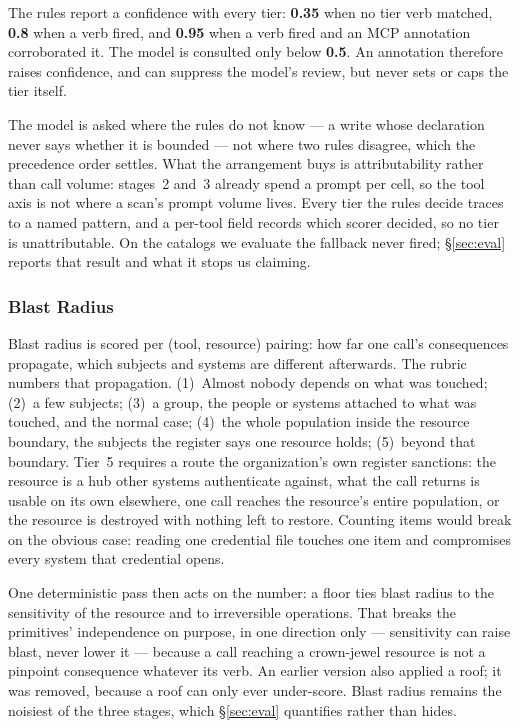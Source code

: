 The rules report a confidence with every tier: \textbf{0.35} when no tier verb
matched, \textbf{0.8} when a verb fired, and \textbf{0.95} when a verb fired and
an MCP annotation corroborated it. The model is consulted only below
\textbf{0.5}. An annotation therefore raises confidence, and can suppress the
model's review, but never sets or caps the tier itself.

The model is asked where the rules do not know --- a write whose declaration
never says whether it is bounded --- not where two rules disagree, which the
precedence order settles. What the
arrangement buys is attributability rather than call volume: stages~2 and~3
already spend a prompt per cell, so the tool axis is not where a scan's prompt
volume lives. Every tier the rules decide traces to a named pattern, and a per-tool
field records which scorer decided, so no tier is unattributable. On the
catalogs we evaluate the fallback never fired; \S\ref{sec:eval} reports that
result and what it stops us claiming.

\subsubsection{Blast Radius}
\label{sec:blast}

Blast radius is scored per (tool, resource) pairing: how far one call's
consequences propagate, which subjects and systems are different afterwards.
The rubric numbers that propagation. (1)~Almost nobody depends on what was
touched; (2)~a few subjects; (3)~a group, the people or systems
attached to what was touched, and the normal case; (4)~the whole population
inside the resource boundary, the subjects the register says one resource
holds; (5)~beyond that boundary. Tier~5 requires a route the organization's own
register sanctions: the resource is a hub other systems
authenticate against, what the call returns is usable on its own elsewhere, one
call reaches the resource's entire population, or the resource is destroyed
with nothing left to restore. Counting items would break on the obvious case:
reading one credential file touches one item and compromises every system that
credential opens.

One deterministic pass then acts on the number: a floor ties blast radius to
the sensitivity of the resource and to irreversible operations. That breaks the
primitives' independence on purpose, in one direction only --- sensitivity can
raise blast, never lower it --- because a call reaching a crown-jewel resource
is not a pinpoint consequence whatever its verb. An earlier version also
applied a roof; it was removed, because a roof can only
ever under-score. Blast radius remains the noisiest of the three stages, which
\S\ref{sec:eval} quantifies rather than hides.

